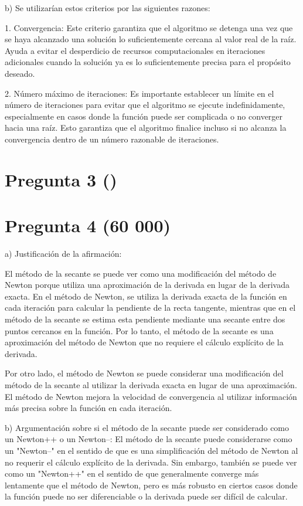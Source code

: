 \documentclass[a4paper,12pt]{article}
\begin{document}
b) Se utilizarían estos criterios por las siguientes razones:

1. Convergencia: Este criterio garantiza que el algoritmo se detenga una vez que se haya alcanzado una solución lo suficientemente cercana al valor real de la raíz. Ayuda a evitar el desperdicio de recursos computacionales en iteraciones adicionales cuando la solución ya es lo suficientemente precisa para el propósito deseado.

2. Número máximo de iteraciones: Es importante establecer un límite en el número de iteraciones para evitar que el algoritmo se ejecute indefinidamente, especialmente en casos donde la función puede ser complicada o no converger hacia una raíz. Esto garantiza que el algoritmo finalice incluso si no alcanza la convergencia dentro de un número razonable de iteraciones.


\section*{Pregunta 3 ()}


\section*{Pregunta 4 (60 000)}

a) Justificación de la afirmación:

El método de la secante se puede ver como una modificación del método de Newton porque utiliza una aproximación de la derivada en lugar de la derivada exacta. En el método de Newton, se utiliza la derivada exacta de la función en cada iteración para calcular la pendiente de la recta tangente, mientras que en el método de la secante se estima esta pendiente mediante una secante entre dos puntos cercanos en la función. Por lo tanto, el método de la secante es una aproximación del método de Newton que no requiere el cálculo explícito de la derivada.

Por otro lado, el método de Newton se puede considerar una modificación del método de la secante al utilizar la derivada exacta en lugar de una aproximación. El método de Newton mejora la velocidad de convergencia al utilizar información más precisa sobre la función en cada iteración.

b) Argumentación sobre si el método de la secante puede ser considerado como un Newton++ o un Newton--:
El método de la secante puede considerarse como un "Newton--" en el sentido de que es una simplificación del método de Newton al no requerir el cálculo explícito de la derivada. Sin embargo, también se puede ver como un "Newton++" en el sentido de que generalmente converge más lentamente que el método de Newton, pero es más robusto en ciertos casos donde la función puede no ser diferenciable o la derivada puede ser difícil de calcular.
\end{document}
